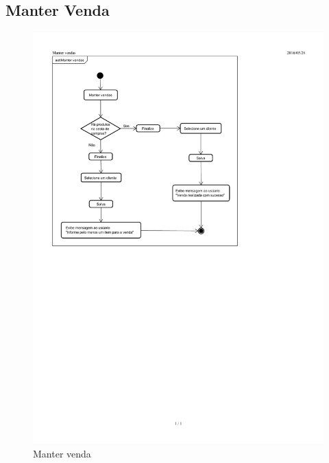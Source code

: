 \documentclass[chapter=TITLE,12pt,oneside,a4paper,english,french,sumario=tradicional,spanish,brazil,]{abntex2}
\begin{document}
\subsection{Manter Venda}
\begin{figure}[h]\centering
	\includegraphics[scale=1.29]{venda.pdf}\caption{Manter venda}
\end{figure}

\newpage
\end{document}
